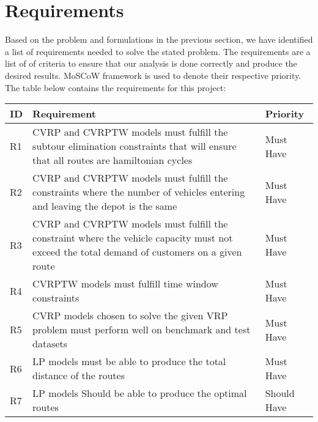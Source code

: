 \section{Requirements}
Based on the problem and formulations in the previous section,
we have identified a list of requirements needed to solve the stated problem.
The requirements are a list of of criteria to ensure that our analysis is done correctly and produce the desired results.
MoSCoW framework is used to denote their respective priority. The table below contains the requirements for this project:
\vspace{0.5cm}
\begin{table}[!ht]
\centering
\begin{tabular}{|l|p{8cm}|l|}
\hline
ID & Requirement                                                                                                                                                     & Priority    \\ \hline
R1  & CVRP and CVRPTW models must fulfill the subtour elimination constraints that will ensure that all routes are hamiltonian cycles                                                                                                   & Must Have   \\ \hline
R2  & CVRP and CVRPTW models must fulfill the constraints where the number of vehicles entering and leaving the depot is the same                                                                                                       & Must Have   \\ \hline
R3  & CVRP and CVRPTW models must fulfill the constraint where the vehicle capacity must not exceed the total demand of customers on a given route                                                                                               & Must Have   \\ \hline
R4  & CVRPTW models  must fulfill time window constraints                                                                                               & Must Have   \\ \hline
R5  & CVRP models chosen to solve the given VRP problem must perform well on benchmark and test datasets                                                                & Must Have   \\ \hline
R6  & LP models must be able to produce the total distance of the routes                                                                                              & Must Have   \\ \hline
R7  & LP models Should be able to produce the optimal routes                                                                                                          & Should Have \\ \hline

\end{tabular}
\end{table}
